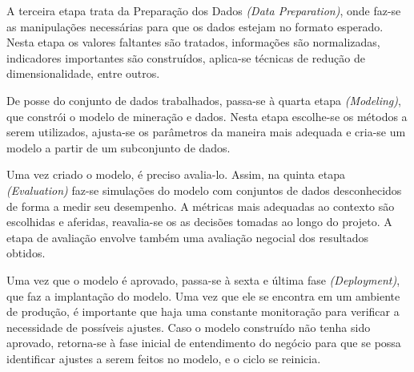 A terceira etapa trata da Preparação dos Dados \textit{(Data Preparation)}, onde faz-se as manipulações necessárias para que os dados estejam no formato esperado. Nesta etapa os valores faltantes são tratados, informações são normalizadas, indicadores importantes são construídos, aplica-se técnicas de redução de dimensionalidade, entre outros. 

De posse do conjunto de dados trabalhados, passa-se à quarta etapa \textit{(Modeling)}, que constrói o modelo de mineração e dados. Nesta etapa escolhe-se os métodos a serem utilizados, ajusta-se os parâmetros da maneira mais adequada e cria-se um modelo a partir de um subconjunto de dados. 

Uma vez criado o modelo, é preciso avalia-lo. Assim, na quinta etapa \textit{(Evaluation) }faz-se simulações do modelo com conjuntos de dados desconhecidos de forma a medir seu desempenho. A métricas mais adequadas ao contexto são escolhidas e aferidas, reavalia-se os as decisões tomadas ao longo do projeto. A etapa de avaliação envolve também uma avaliação negocial dos resultados obtidos.

Uma vez que o modelo é aprovado, passa-se à sexta e última fase \textit{(Deployment)}, que faz a implantação do modelo. Uma vez que ele se encontra em um ambiente de produção, é importante que haja uma constante monitoração para verificar a necessidade de possíveis ajustes. Caso o modelo construído não tenha sido aprovado, retorna-se à fase inicial de entendimento do negócio para que se possa identificar ajustes a serem feitos no modelo, e o ciclo se reinicia. 
